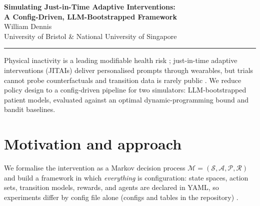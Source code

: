 \documentclass[11pt,a4paper]{article}
\newcommand{\paperrule}{\noindent\rule{\textwidth}{0.6pt}\par\vspace{6pt}}
\begin{document}
\begin{center}
  {\LARGE\bfseries Simulating Just-in-Time Adaptive Interventions:\\[2pt]
   A Config-Driven, LLM-Bootstrapped Framework}\\[4pt]
  {\normalsize William Dennis}\\[2pt]
  {\small University of Bristol \& National University of Singapore}\\[4pt]
  \paperrule
\end{center}

Physical inactivity is a leading modifiable health risk
\cite{guthold2018insufficient}; just-in-time adaptive
interventions (JITAIs) deliver personalised prompts through wearables, but trials
cannot probe counterfactuals and transition data is rarely public
\cite{wang2021optimizing}. We
reduce policy design to a config-driven pipeline for two simulators:
LLM-bootstrapped patient models, evaluated against an optimal dynamic-programming
bound and bandit baselines.

\section{Motivation and approach}
We formalise the intervention as a Markov decision process
$\mathcal{M}=(\mathcal{S},\mathcal{A},\mathcal{P},\mathcal{R})$ and build a
framework in which \emph{everything} is configuration: state spaces, action sets,
transition models, rewards, and agents are declared in YAML, so experiments differ by
config file alone (configs and tables in the repository)
\cite{klasnja2019heartsteps,trella2022designing}.
\end{document}
